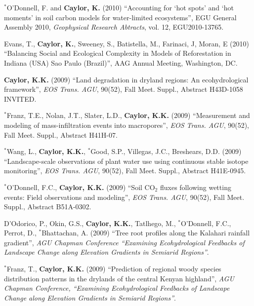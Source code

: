 \documentclass[10pt]{report}
\begin{document}
\begin{etaremune}
\item $^{*}$O'Donnell, F. and \textbf{Caylor, K.} (2010) ``Accounting for `hot spots' and `hot moments' in soil carbon models for water-limited ecosystems'', EGU General Assembly 2010, \emph{Geophysical Research Abtracts}, vol. 12, EGU2010-13765.

\item Evans, T., \textbf{Caylor, K.}, Sweeney, S., Batistella, M., Farinaci, J, Moran, E (2010) ``Balancing Social and Ecological Complexity in Models of Reforestation in Indiana (USA) Sao Paulo (Brazil)'', AAG Annual Meeting, Washington, DC.

\item \textbf{Caylor, K.K.} (2009) ``Land degradation in dryland regions: An ecohydrological framework'', \emph{EOS Trans. AGU}, 90(52), Fall Meet. Suppl., Abstract H43D-1058 INVITED. 

\item $^{*}$Franz, T.E., Nolan, J.T., Slater, L.D.,  \textbf{Caylor, K.K.} (2009) ``Measurement and modeling of mass-infiltration events into macropores'', \emph{EOS Trans. AGU}, 90(52), Fall Meet. Suppl., Abstract H41H-07.

\item $^{*}$Wang, L.,  \textbf{Caylor, K.K.}, $^{*}$Good, S.P., Villegas, J.C., Breshears, D.D. (2009) ``Landscape-scale observations of plant water use using continuous stable isotope monitoring'', \emph{EOS Trans. AGU}, 90(52), Fall Meet. Suppl., Abstract H41E-0945.

\item $^{*}$O'Donnell, F.C., \textbf{Caylor, K.K.} (2009) ``Soil CO$_{2}$ fluxes following wetting events: Field observations and modeling'', \emph{EOS Trans. AGU}, 90(52), Fall Meet. Suppl., Abstract B51A-0302.

\item D'Odorico, P., Okin, G.S., \textbf{Caylor, K.K.}, Tatlhego, M.,  $^{*}$O'Donnell, F.C., Perrot, D., $^{*}$Bhattachan, A. (2009) ``Tree root profiles along the Kalahari rainfall gradient'', \emph{AGU Chapman Conference  ``Examining Ecohydrological Feedbacks of Landscape Change along Elevation Gradients in Semiarid Regions''}.

\item $^{*}$Franz, T., \textbf{Caylor, K.K.} (2009) ``Prediction of regional woody species distribution patterns in the drylands of the central Kenyan highland'', \emph{AGU Chapman Conference, ``Examining Ecohydrological Feedbacks of Landscape Change along Elevation Gradients in Semiarid Regions''}.


\end{etaremune}
\end{document}
